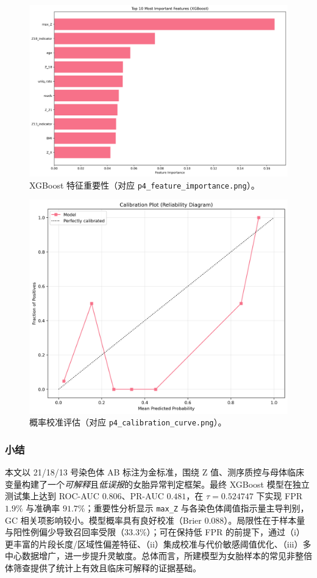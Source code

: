 \documentclass[withoutpreface]{cumcmthesis}
\begin{document}
\begin{figure}[!t]
\centering
\includegraphics[width=0.85\linewidth]{output/figures/p4_feature_importance.png}
\caption{XGBoost 特征重要性（对应 \texttt{p4\_feature\_importance.png}）。}
\label{fig:p4_importance}
\end{figure}

\begin{figure}[!t]
\centering
\includegraphics[width=0.7\linewidth]{output/figures/p4_calibration_curve.png}
\caption{概率校准评估（对应 \texttt{p4\_calibration\_curve.png}）。}
\label{fig:p4_calib}
\end{figure}

\subsubsection{小结}
本文以 21/18/13 号染色体 AB 标注为金标准，围绕 Z 值、测序质控与母体临床变量构建了一个\emph{可解释}且\emph{低误报}的女胎异常判定框架。最终 XGBoost 模型在独立测试集上达到 ROC-AUC $0.806$、PR-AUC $0.481$，在 $\tau=0.524747$ 下实现 FPR $1.9\%$ 与准确率 $91.7\%$；重要性分析显示 \texttt{max\_Z} 与各染色体阈值指示量主导判别，GC 相关项影响较小。模型概率具有良好校准（Brier $0.088$）。局限性在于样本量与阳性例偏少导致召回率受限（$33.3\%$）；可在保持低 FPR 的前提下，通过（i）更丰富的片段长度/区域性偏差特征、（ii）集成校准与代价敏感阈值优化、（iii）多中心数据增广，进一步提升灵敏度。总体而言，所建模型为女胎样本的常见非整倍体筛查提供了统计上有效且临床可解释的证据基础。
\end{document}
